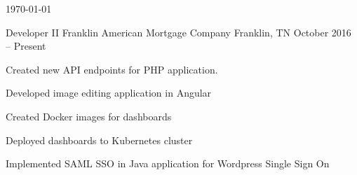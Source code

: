 \documentclass[letterpaper]{awesome-cv}
\begin{document}
\makecvfooter
{\today}
{}
{\thepage}

\makecvheader[C]

\begin{cventries}
	\cventry
    {Developer II}
    {Franklin American Mortgage Company}
    {Franklin, TN}
    {October 2016 – Present}
    {\begin{cvitems}
      \item {Created new API endpoints for PHP application.}
      \item {Developed image editing application in Angular}
      \item {Created Docker images for dashboards}
      \item {Deployed dashboards to Kubernetes cluster}
      \item {Implemented SAML SSO in Java application for Wordpress Single Sign On}
      \end{cvitems}}


\end{cventries}
\end{document}
